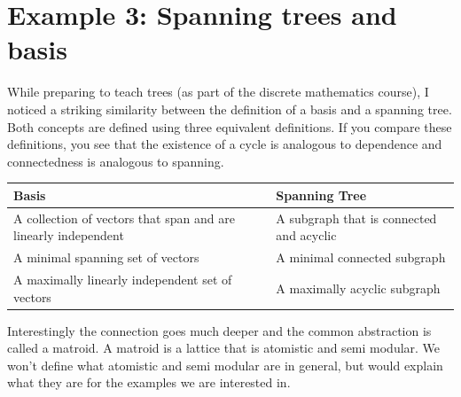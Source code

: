 \documentclass[12pt]{amsart}
\begin{document}
\section{Example 3: Spanning trees and basis}

While preparing to teach trees (as part of the discrete mathematics course), I noticed a striking similarity between the definition of a basis and a spanning tree.  Both concepts are defined using three equivalent definitions.  If you compare these definitions, you see that the existence of a cycle is analogous to dependence and connectedness is analogous to spanning.  
\begin{table}[htbp]
    \centering
    \renewcommand{\arraystretch}{1.8}
    \begin{tabular}{|>{\raggedright\arraybackslash}p{6cm} | >{\raggedright\arraybackslash}p{6cm} |}
        \hline
        \textbf{Basis} & \textbf{Spanning Tree} \\
        \hline
        A collection of vectors that span and are linearly independent & A subgraph that is connected and acyclic\\
        \hline
        A minimal spanning set of vectors & A minimal connected subgraph\\
        \hline
        A maximally linearly independent set of vectors & A maximally acyclic subgraph\\
        \hline
    \end{tabular}
\end{table}
Interestingly the connection goes much deeper and the common abstraction is called a matroid. A matroid is a lattice that is atomistic and semi modular.  We won't define what atomistic and semi modular are in general, but would explain what they are for the examples we are interested in.  
\end{document}
